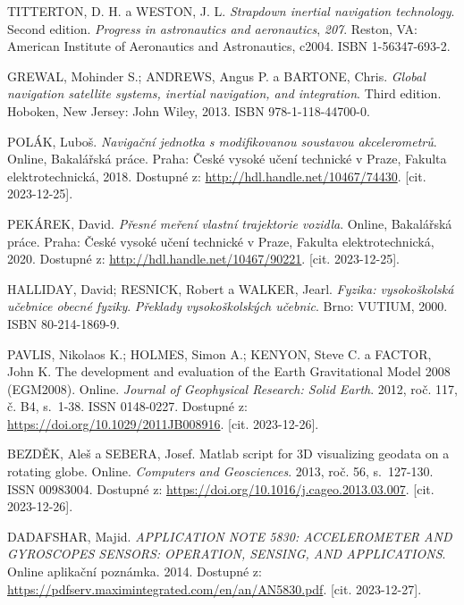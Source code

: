 \begin{thebibliography}{99}

TITTERTON, D. H. a WESTON, J. L. \textit{Strapdown inertial navigation technology}. Second edition. \textit{Progress in astronautics and aeronautics}, \textit{207}. Reston, VA: American Institute of Aeronautics and Astronautics, c2004. ISBN 1-56347-693-2.

GREWAL, Mohinder S.; ANDREWS, Angus P. a BARTONE, Chris. \textit{Global navigation satellite systems, inertial navigation, and integration}. Third edition. Hoboken, New Jersey: John Wiley, 2013. ISBN 978-1-118-44700-0.

POLÁK, Luboš. \textit{Navigační jednotka s modifikovanou soustavou akcelerometrů}. Online, Bakalářská práce. Praha: České vysoké učení technické v Praze, Fakulta elektrotechnická, 2018. Dostupné z: \url{http://hdl.handle.net/10467/74430}. [cit. 2023-12-25].

PEKÁREK, David. \textit{Přesné meření vlastní trajektorie vozidla}. Online, Bakalářská práce. Praha: České vysoké učení technické v Praze, Fakulta elektrotechnická, 2020. Dostupné z: \url{http://hdl.handle.net/10467/90221}. [cit. 2023-12-25].

HALLIDAY, David; RESNICK, Robert a WALKER, Jearl. \textit{Fyzika: vysokoškolská učebnice obecné fyziky}. \textit{Překlady vysokoškolských učebnic}. Brno: VUTIUM, 2000. ISBN 80-214-1869-9.

PAVLIS, Nikolaos K.; HOLMES, Simon A.; KENYON, Steve C. a FACTOR, John K. The development and evaluation of the Earth Gravitational Model 2008 (EGM2008). Online. \textit{Journal of Geophysical Research: Solid Earth}. 2012, roč. 117, č. B4, s.~1-38. ISSN 0148-0227. Dostupné z: \url{https://doi.org/10.1029/2011JB008916}. [cit. 2023-12-26].

BEZDĚK, Aleš a SEBERA, Josef. Matlab script for 3D visualizing geodata on a rotating globe. Online. \textit{Computers and Geosciences}. 2013, roč. 56, s.~127-130. ISSN 00983004. Dostupné z: \url{https://doi.org/10.1016/j.cageo.2013.03.007}. [cit. 2023-12-26].

DADAFSHAR, Majid. \textit{APPLICATION NOTE 5830: ACCELEROMETER AND GYROSCOPES SENSORS: OPERATION, SENSING, AND APPLICATIONS}. Online aplikační poznámka. 2014. Dostupné z: \url{https://pdfserv.maximintegrated.com/en/an/AN5830.pdf}. [cit. 2023-12-27].


\end{thebibliography}
